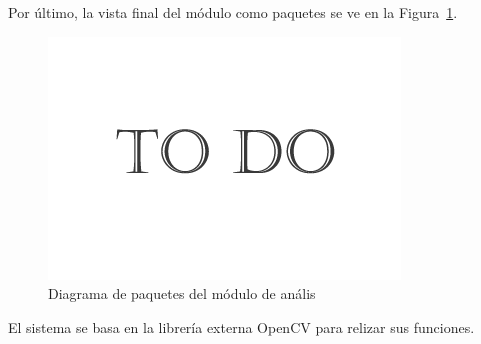 Por último, la vista final del módulo como paquetes se ve en la Figura~\ref{fig:diagramapaquetesPHIC}.\\

		\begin{figure}[htbp]
		\centering
		\includegraphics[scale=0.47]{graphics/todo.png}
		\caption{Diagrama de paquetes del módulo de anális}
		\label{fig:diagramapaquetesPHIC}
		\end{figure}
		
El sistema se basa en la librería externa OpenCV para relizar sus funciones.